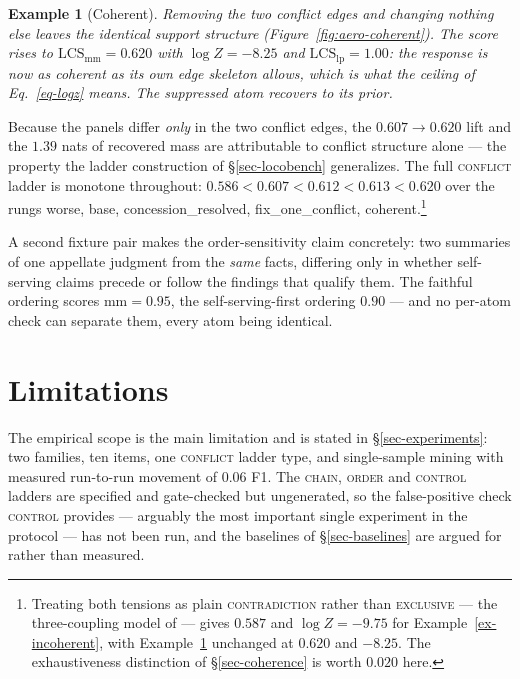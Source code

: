 \documentclass{article} %
\newtheorem{example}{Example}
\newcommand{\coupling}[1]{\textsc{#1}}          %
\newcommand{\LCS}{\mathrm{LCS}}
\newcommand{\readout}[1]{\ensuremath{\mathrm{#1}}}
\newcommand{\mm}{\readout{mm}}
\newcommand{\lp}{\readout{lp}}
\begin{document}
\begin{example}[Coherent]
\label{ex-coherent}
Removing the two conflict edges and changing nothing else leaves the identical support
structure (Figure~\ref{fig:aero-coherent}). The score rises to $\LCS_{\mm}=0.620$ with
$\log Z=-8.25$ and $\LCS_{\lp}=1.00$: the response is now as coherent as its own edge
skeleton allows, which is what the ceiling of Eq.~\ref{eq-logz} means. The suppressed atom
recovers to its prior.
\end{example}

Because the panels differ \emph{only} in the two conflict edges, the $0.607\!\to\!0.620$ lift and
the $1.39$ nats of recovered mass are attributable to conflict structure alone --- the property the
ladder construction of \S\ref{sec-locobench} generalizes. The full \textsc{conflict} ladder is
monotone throughout: $0.586 < 0.607 < 0.612 < 0.613 < 0.620$ over the rungs worse, base,
concession\_resolved, fix\_one\_conflict, coherent.\footnote{Treating
both tensions as plain \coupling{contradiction} rather than \coupling{exclusive} --- the
three-coupling model of \citet{factreasoner} --- gives $0.587$ and $\log Z=-9.75$ for
Example~\ref{ex-incoherent}, with Example~\ref{ex-coherent} unchanged at $0.620$ and
$-8.25$. The exhaustiveness distinction of \S\ref{sec-coherence} is worth $0.020$ here.}

A second fixture pair makes the order-sensitivity claim concretely: two summaries of one appellate
judgment from the \emph{same} facts, differing only in whether self-serving claims precede or
follow the findings that qualify them. The faithful ordering scores $\mm=0.95$, the
self-serving-first ordering $0.90$ --- and no per-atom check can separate them, every atom being
identical.

\section{Limitations}
\label{sec-limitations}

The empirical scope is the main limitation and is stated in \S\ref{sec-experiments}: two
families, ten items, one \textsc{conflict} ladder type, and single-sample mining with measured
run-to-run movement of $0.06$ F1. The \textsc{chain}, \textsc{order} and \textsc{control} ladders
are specified and gate-checked but ungenerated, so the false-positive check \textsc{control}
provides --- arguably the most important single experiment in the protocol --- has not been run,
and the baselines of \S\ref{sec-baselines} are argued for rather than measured.
\end{document}
